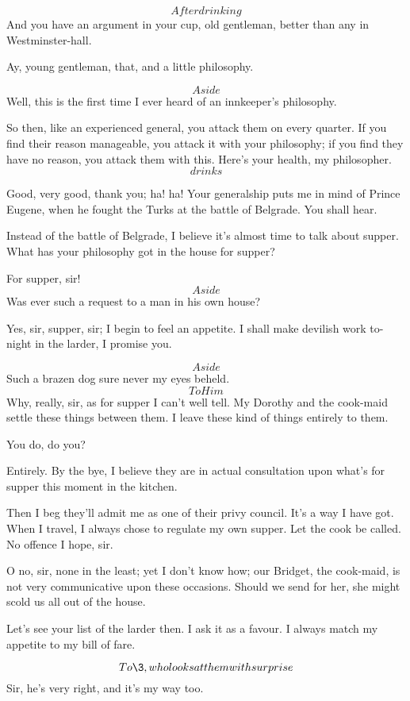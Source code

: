 \documentclass{book}
\begin{document}
\2  \[After drinking\]  And you have an argument in your cup, old
gentleman, better than any in Westminster-hall.

\3  Ay, young gentleman, that, and a little philosophy.

\2  \[Aside\]  Well, this is the first time I ever heard of an
innkeeper's philosophy.

\4  So then, like an experienced general, you attack them on
every quarter.  If you find their reason manageable, you attack it with
your philosophy; if you find they have no reason, you attack them with
this.  Here's your health, my philosopher.\[drinks\]

\3  Good, very good, thank you; ha! ha!  Your generalship puts
me in mind of Prince Eugene, when he fought the Turks at the battle of
Belgrade.  You shall hear.

\2  Instead of the battle of Belgrade, I believe it's almost time
to talk about supper.  What has your philosophy got in the house for
supper?

\3  For supper, sir!  \[Aside\]  Was ever such a request to a
man in his own house?

\2  Yes, sir, supper, sir; I begin to feel an appetite.  I shall
make devilish work to-night in the larder, I promise you.

\3  \[Aside\]  Such a brazen dog sure never my eyes beheld. 
\[To Him\]  Why, really, sir, as for supper I can't well tell.  My
Dorothy and the cook-maid settle these things between them.  I leave
these kind of things entirely to them.

\2  You do, do you?

\3  Entirely.  By the bye, I believe they are in actual
consultation upon what's for supper this moment in the kitchen.

\2  Then I beg they'll admit me as one of their privy council. 
It's a way I have got.  When I travel, I always chose to regulate my
own supper.  Let the cook be called.  No offence I hope, sir.

\3  O no, sir, none in the least; yet I don't know how; our
Bridget, the cook-maid, is not very communicative upon these
occasions.  Should we send for her, she might scold us all out of the
house.

\4  Let's see your list of the larder then.  I ask it as a
favour.  I always match my appetite to my bill of fare.

\2  \[To \3, who looks at them with surprise\]  Sir, he's
very right, and it's my way too.
\end{document}
